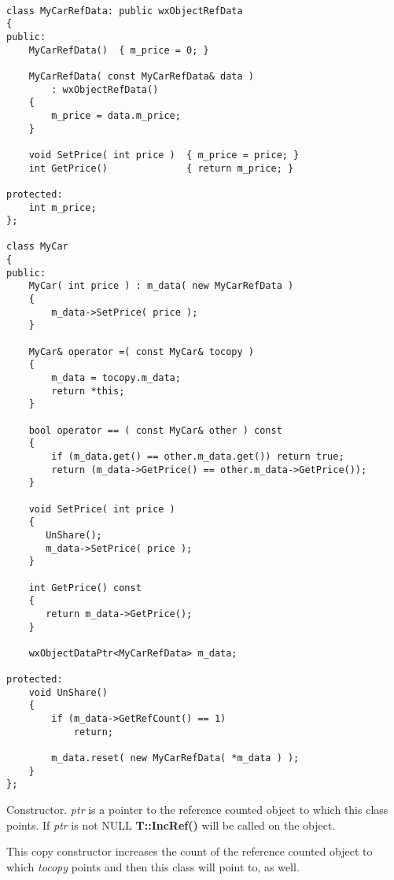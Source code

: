 \begin{verbatim}

class MyCarRefData: public wxObjectRefData
{
public:
    MyCarRefData()  { m_price = 0; }
    
    MyCarRefData( const MyCarRefData& data )
        : wxObjectRefData()
    {
        m_price = data.m_price;
    }

    void SetPrice( int price )  { m_price = price; }
    int GetPrice()              { return m_price; }
    
protected:
    int m_price;
};

class MyCar
{
public:
    MyCar( int price ) : m_data( new MyCarRefData )
    {
        m_data->SetPrice( price );
    }
    
    MyCar& operator =( const MyCar& tocopy )
    {
        m_data = tocopy.m_data;
        return *this;
    }
    
    bool operator == ( const MyCar& other ) const
    {
        if (m_data.get() == other.m_data.get()) return true;
        return (m_data->GetPrice() == other.m_data->GetPrice());
    }

    void SetPrice( int price )
    {
       UnShare();
       m_data->SetPrice( price );
    }
    
    int GetPrice() const
    {
       return m_data->GetPrice();
    }

    wxObjectDataPtr<MyCarRefData> m_data;
    
protected:
    void UnShare()
    {
        if (m_data->GetRefCount() == 1)
            return;
    
        m_data.reset( new MyCarRefData( *m_data ) );
    }
};

\end{verbatim}



\label{wxobjectdataptrwxobjectdataptr}


Constructor. {\it ptr} is a pointer to the reference
counted object to which this class points. If {\it ptr}
is not NULL {\bf T::IncRef()} will be called on the
object.


This copy constructor increases the count of the reference
counted object to which {\it tocopy} points and then this
class will point to, as well.


